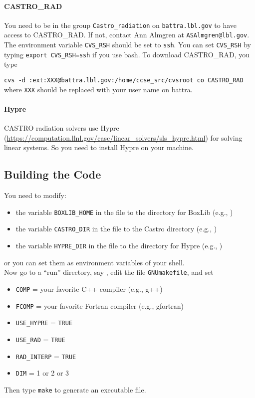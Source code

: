 \documentclass[11pt,letterpaper]{article}
\begin{document}
\paragraph{CASTRO\_RAD} You need to be in the group {\tt Castro\_radiation}
on {\tt battra.lbl.gov} to have access to CASTRO\_RAD.  If not, contact Ann
Almgren at {\tt ASAlmgren@lbl.gov}.  The environment variable
\verb|CVS_RSH| should be set to \verb|ssh|.  You can set
\verb|CVS_RSH| by typing \verb|export CVS_RSH=ssh| if you use bash. To
download CASTRO\_RAD, you type \vspace{5pt}

\verb|cvs -d :ext:XXX@battra.lbl.gov:/home/ccse_src/cvsroot co CASTRO_RAD|\\[5pt]
where {\tt XXX} should be replaced with your user name on battra.

\paragraph{Hypre} CASTRO radiation solvers use Hypre
(\url{https://computation.llnl.gov/casc/linear_solvers/sls_hypre.html})
for solving linear systems.  So you need to install Hypre on your
machine.

\subsection{Building the Code}

You need to modify:
\begin{itemize}
\item the variable {\tt BOXLIB\_HOME} in the file
  {\tt{}} to the
  directory for BoxLib (e.g., {\tt{}})
\item the variable {\tt CASTRO\_DIR} in the file
  {\tt{}} to
  the Castro directory
  (e.g., {\tt{}})
\item the variable {\tt HYPRE\_DIR} in the file
  {\tt{}} to
  the directory for Hypre (e.g., {\tt{}})
\end{itemize}
or you can set them as environment variables of your shell.  \\


Now go to a ``run'' directory, say
{\tt{}},
edit the file {\tt GNUmakefile}, and set
\begin{itemize}
\item {\tt COMP} = your favorite C++ compiler (e.g., g++)
\item {\tt FCOMP} = your favorite Fortran compiler (e.g., gfortran)
\item {\tt USE\_HYPRE} = {\tt TRUE}
\item {\tt USE\_RAD}   = {\tt TRUE}
\item {\tt RAD\_INTERP}   = {\tt TRUE}
\item {\tt DIM}   = 1 or 2 or 3
\end{itemize}
Then type {\tt make} to generate an executable file.  
\end{document}
